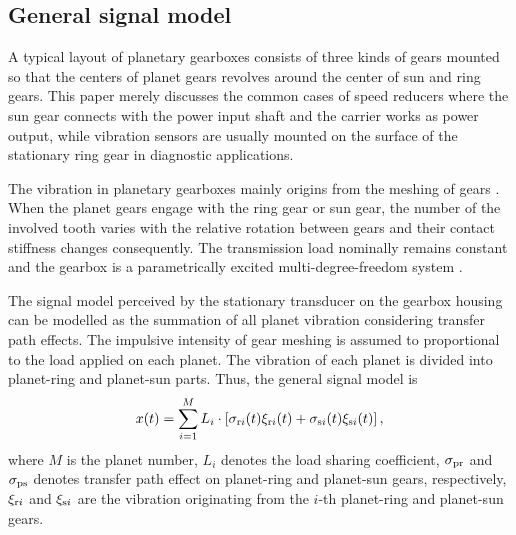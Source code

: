 \documentclass[a4paper,fleqn]{cas-sc}%
\begin{document}
\subsection{General signal model}
\par A typical layout of planetary gearboxes consists of three kinds of gears mounted so that the centers of planet gears revolves around the center of sun and ring gears. This paper merely discusses the common cases of speed reducers where the sun gear connects with the power input shaft and the carrier works as power output, while vibration sensors are usually mounted on the surface of the stationary ring gear in diagnostic applications. 
\par The vibration in planetary gearboxes mainly origins from the meshing of gears \cite{Velex1996}. When the planet gears engage with the ring gear or sun gear, the number of the involved tooth varies with the relative rotation between gears and their contact stiffness changes consequently. The transmission load nominally remains constant and the gearbox is a parametrically excited multi-degree-freedom system \cite{Acar2019}. 
\par The signal model perceived by the stationary transducer on the gearbox housing can be modelled as the summation of all planet vibration considering transfer path effects. The impulsive intensity of gear meshing is assumed to proportional to the load applied on each planet. The vibration of each planet is divided into planet-ring and planet-sun parts. Thus, the general signal model is
\begin{equation}
    x(t)=\sum_{i=1}^{M} L_i \cdot \left[ \sigma_{{\rm r}i}(t) \xi_{{\rm r}i}(t) + \sigma_{{\rm s}i}(t) \xi_{{\rm s}i}(t) \right], \label{eq:general_signal}
\end{equation}
where $M$ is the planet number, $L_i$ denotes the load sharing coefficient, $\sigma_{\rm pr}$ and $\sigma_{\rm ps}$ denotes transfer path effect on planet-ring and planet-sun gears, respectively, $\xi_{{\rm r}i}$ and $\xi_{{\rm s}i}$ are the vibration originating from the $i$-th planet-ring and planet-sun gears.
\end{document}
